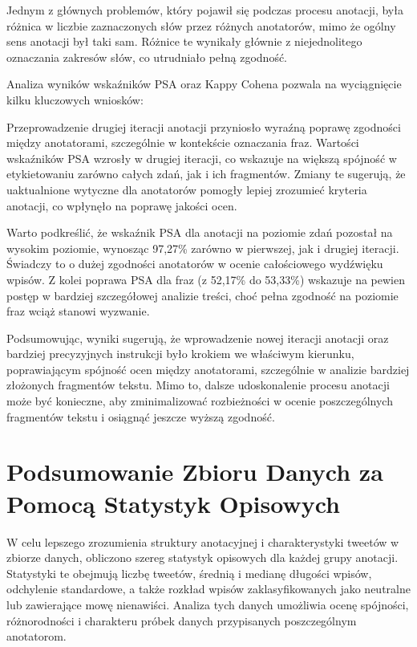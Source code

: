 \documentclass[12pt]{article}
\begin{document}
Jednym z głównych problemów, który pojawił się podczas procesu anotacji, była różnica w liczbie zaznaczonych słów przez różnych anotatorów, mimo że ogólny sens anotacji był taki sam. Różnice te wynikały głównie z niejednolitego oznaczania zakresów słów, co utrudniało pełną zgodność.

Analiza wyników wskaźników PSA oraz Kappy Cohena pozwala na wyciągnięcie kilku kluczowych wniosków:

Przeprowadzenie drugiej iteracji anotacji przyniosło wyraźną poprawę zgodności między anotatorami, szczególnie w kontekście oznaczania fraz. Wartości wskaźników PSA wzrosły w drugiej iteracji, co wskazuje na większą spójność w etykietowaniu zarówno całych zdań, jak i ich fragmentów. Zmiany te sugerują, że uaktualnione wytyczne dla anotatorów pomogły lepiej zrozumieć kryteria anotacji, co wpłynęło na poprawę jakości ocen.

Warto podkreślić, że wskaźnik PSA dla anotacji na poziomie zdań pozostał na wysokim poziomie, wynosząc 97,27\% zarówno w pierwszej, jak i drugiej iteracji. Świadczy to o dużej zgodności anotatorów w ocenie całościowego wydźwięku wpisów. Z kolei poprawa PSA dla fraz (z 52,17\% do 53,33\%) wskazuje na pewien postęp w bardziej szczegółowej analizie treści, choć pełna zgodność na poziomie fraz wciąż stanowi wyzwanie.

Podsumowując, wyniki sugerują, że wprowadzenie nowej iteracji anotacji oraz bardziej precyzyjnych instrukcji było krokiem we właściwym kierunku, poprawiającym spójność ocen między anotatorami, szczególnie w analizie bardziej złożonych fragmentów tekstu. Mimo to, dalsze udoskonalenie procesu anotacji może być konieczne, aby zminimalizować rozbieżności w ocenie poszczególnych fragmentów tekstu i osiągnąć jeszcze wyższą zgodność.

\section{Podsumowanie Zbioru Danych za Pomocą Statystyk Opisowych}

W celu lepszego zrozumienia struktury anotacyjnej i charakterystyki tweetów w zbiorze danych, obliczono szereg statystyk opisowych dla każdej grupy anotacji. Statystyki te obejmują liczbę tweetów, średnią i medianę długości wpisów, odchylenie standardowe, a także rozkład wpisów zaklasyfikowanych jako neutralne lub zawierające mowę nienawiści. Analiza tych danych umożliwia ocenę spójności, różnorodności i charakteru próbek danych przypisanych poszczególnym anotatorom.
\end{document}

